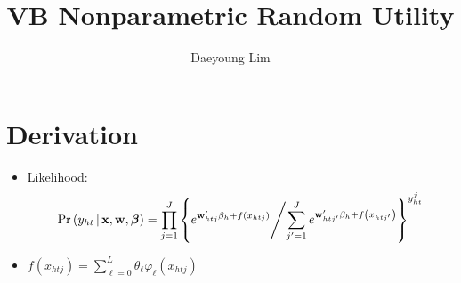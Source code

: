 \documentclass[review]{elsarticle}
\begin{document}
\begin{frontmatter}

\title{VB Nonparametric Random Utility}
\author{Daeyoung Lim}


\end{frontmatter}

\linenumbers
\section{Derivation}
\begin{itemize}
  \item Likelihood:
  \begin{equation}
    \Pr\left(y_{ht}\,|\,\mathbf{x},\mathbf{w},\bm{\beta}\right) = \prod_{j=1}^{J}\left\{e^{\mathbf{w}_{htj}'\beta_{h}+f\left(x_{htj}\right)}\middle/\sum_{j'=1}^{J}e^{\mathbf{w}_{htj'}'\beta_{h}+f\left(x_{htj'}\right)} \right\}^{y_{ht}^{j}}
  \end{equation}
  \item $f\left(x_{htj}\right)=\displaystyle\sum_{\ell=0}^{L}\theta_{\ell}\varphi_{\ell}\left(x_{htj}\right)$
\end{itemize}
\end{document}
